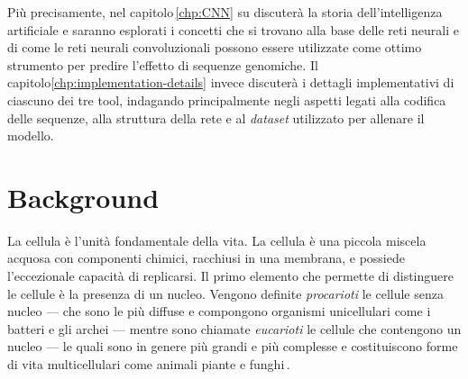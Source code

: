 Più precisamente, nel capitolo\,\ref{chp:CNN} su discuterà la storia dell'intelligenza artificiale e saranno esplorati i concetti che si trovano alla base delle reti neurali e di come le reti neurali convoluzionali possono essere utilizzate come ottimo strumento per predire l'effetto di sequenze genomiche. Il capitolo\ref{chp:implementation-details} invece discuterà i dettagli implementativi di ciascuno dei tre tool, indagando principalmente negli aspetti legati alla codifica delle sequenze, alla struttura della rete e al \textsl{dataset} utilizzato per allenare il modello.



\section{Background}

La cellula è l'unità fondamentale della vita. La cellula è una piccola miscela acquosa con componenti chimici, racchiusi in una membrana, e possiede l'eccezionale capacità di replicarsi. Il primo elemento che permette di distinguere le cellule è la presenza di un nucleo. Vengono definite \textsl{procarioti} le cellule senza nucleo — che sono le più diffuse e compongono organismi unicellulari come i batteri e gli archei — mentre sono chiamate \textsl{eucarioti} le cellule che contengono un nucleo — le quali sono in genere più grandi e più complesse e costituiscono forme di vita multicellulari come animali piante e funghi\,\cite{alberts2015essential}.

